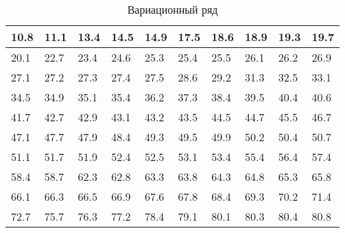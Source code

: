 \documentclass{article}
\theoremstyle{problemstyle}
\begin{document}
\begin{table}[H]
	\centering
	\begin{tabular}{|l|l|l|l|l|l|l|l|l|l|}
		\hline
		10.8 & 11.1 & 13.4 & 14.5 & 14.9 & 17.5 & 18.6 & 18.9 & 19.3 & 19.7 \\
		\hline
		20.1 & 22.7 & 23.4 & 24.6 & 25.3 & 25.4 & 25.5 & 26.1 & 26.2 & 26.9 \\
		\hline
		27.1 & 27.2 & 27.3 & 27.4 & 27.5 & 28.6 & 29.2 & 31.3 & 32.5 & 33.1 \\
		\hline
		34.5 & 34.9 & 35.1 & 35.4 & 36.2 & 37.3 & 38.4 & 39.5 & 40.4 & 40.6 \\
		\hline
		41.7 & 42.7 & 42.9 & 43.1 & 43.2 & 43.5 & 44.5 & 44.7 & 45.5 & 46.7 \\
		\hline
		47.1 & 47.7 & 47.9 & 48.4 & 49.3 & 49.5 & 49.9 & 50.2 & 50.4 & 50.7 \\
		\hline
		51.1 & 51.7 & 51.9 & 52.4 & 52.5 & 53.1 & 53.4 & 55.4 & 56.4 & 57.4 \\
		\hline
		58.4 & 58.7 & 62.3 & 62.8 & 63.3 & 63.8 & 64.3 & 64.8 & 65.3 & 65.8 \\
		\hline
		66.1 & 66.3 & 66.5 & 66.9 & 67.6 & 67.8 & 68.4 & 69.3 & 70.2 & 71.4 \\
		\hline
		72.7 & 75.7 & 76.3 & 77.2 & 78.4 & 79.1 & 80.1 & 80.3 & 80.4 & 80.8 \\
		\hline
	\end{tabular}
	\caption{Вариационный ряд}\label{table:var_series}
\end{table}
\end{document}
